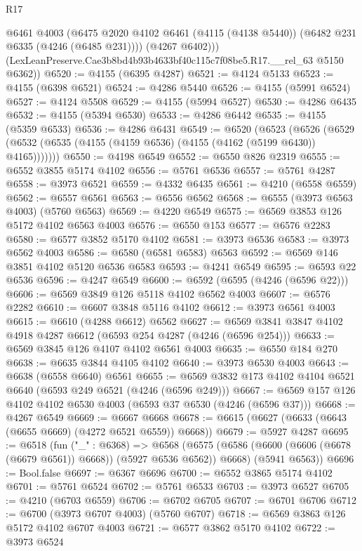 \begin{lexlean}{R17}
\begin{coremodule}
          @6461
          @4003
          (@6475 @2020 @4102 @6461 (@4115 (@4138 @5440)) (@6482 @231 @6335 (@4246 (@6485 @231))))
          (@4267 @6402)))
      (LexLeanPreserve.Cae3b8bd4b93b4633bf40c115c7f08be5.R17.__rel_63 @5150 @6362))
@6520 := @4155 (@6395 @4287)
@6521 := @4124 @5133
@6523 := @4155 (@6398 @6521)
@6524 := @4286 @5440
@6526 := @4155 (@5991 @6524)
@6527 := @4124 @5508
@6529 := @4155 (@5994 @6527)
@6530 := @4286 @6435
@6532 := @4155 (@5394 @6530)
@6533 := @4286 @6442
@6535 := @4155 (@5359 @6533)
@6536 := @4286 @6431
@6549 := @6520
    (@6523
      (@6526 (@6529 (@6532 (@6535 (@4155 (@4159 @6536) (@4155 (@4162 (@5199 @6430)) @4165)))))))
@6550 := @4198 @6549
@6552 := @6550 @826 @2319
@6555 := @6552 @3855 @5174 @4102
@6556 := @5761 @6536
@6557 := @5761 @4287
@6558 := @3973 @6521
@6559 := @4332 @6435
@6561 := @4210 (@6558 @6559)
@6562 := @6557 @6561
@6563 := @6556 @6562
@6568 := @6555 (@3973 @6563 @4003) (@5760 @6563)
@6569 := @4220 @6549
@6575 := @6569 @3853 @126 @5172 @4102 @6563 @4003
@6576 := @6550 @153
@6577 := @6576 @2283
@6580 := @6577 @3852 @5170 @4102
@6581 := @3973 @6536
@6583 := @3973 @6562 @4003
@6586 := @6580 (@6581 @6583) @6563
@6592 := @6569 @146 @3851 @4102 @5120 @6536 @6583
@6593 := @4241 @6549
@6595 := @6593 @22 @6536
@6596 := @4247 @6549
@6600 := @6592 (@6595 (@4246 (@6596 @22)))
@6606 := @6569 @3849 @126 @5118 @4102 @6562 @4003
@6607 := @6576 @2282
@6610 := @6607 @3848 @5116 @4102
@6612 := @3973 @6561 @4003
@6615 := @6610 (@4288 @6612) @6562
@6627 := @6569 @3841 @3847 @4102 @4918 @4287 @6612 (@6593 @254 @4287 (@4246 (@6596 @254)))
@6633 := @6569 @3845 @126 @4107 @4102 @6561 @4003
@6635 := @6550 @184 @270
@6638 := @6635 @3844 @4105 @4102
@6640 := @3973 @6530 @4003
@6643 := @6638 (@6558 @6640) @6561
@6655 := @6569 @3832 @173 @4102 @4104 @6521 @6640 (@6593 @249 @6521 (@4246 (@6596 @249)))
@6667 := @6569 @157 @126 @4102 @4102 @6530 @4003 (@6593 @37 @6530 (@4246 (@6596 @37)))
@6668 := @4267 @6549
@6669 := @6667 @6668
@6678 := @6615 (@6627 (@6633 (@6643 (@6655 @6669) (@4272 @6521 @6559)) @6668))
@6679 := @5927 @4287
@6695 := @6518
    (fun ("_" : @6368) =>
    @6568
      (@6575 (@6586 (@6600 (@6606 (@6678 (@6679 @6561)) @6668)) (@5927 @6536 @6562)) @6668)
      (@5941 @6563))
@6696 := Bool.false
@6697 := @6367 @6696
@6700 := @6552 @3865 @5174 @4102
@6701 := @5761 @6524
@6702 := @5761 @6533
@6703 := @3973 @6527
@6705 := @4210 (@6703 @6559)
@6706 := @6702 @6705
@6707 := @6701 @6706
@6712 := @6700 (@3973 @6707 @4003) (@5760 @6707)
@6718 := @6569 @3863 @126 @5172 @4102 @6707 @4003
@6721 := @6577 @3862 @5170 @4102
@6722 := @3973 @6524

\end{coremodule}
\end{lexlean}
